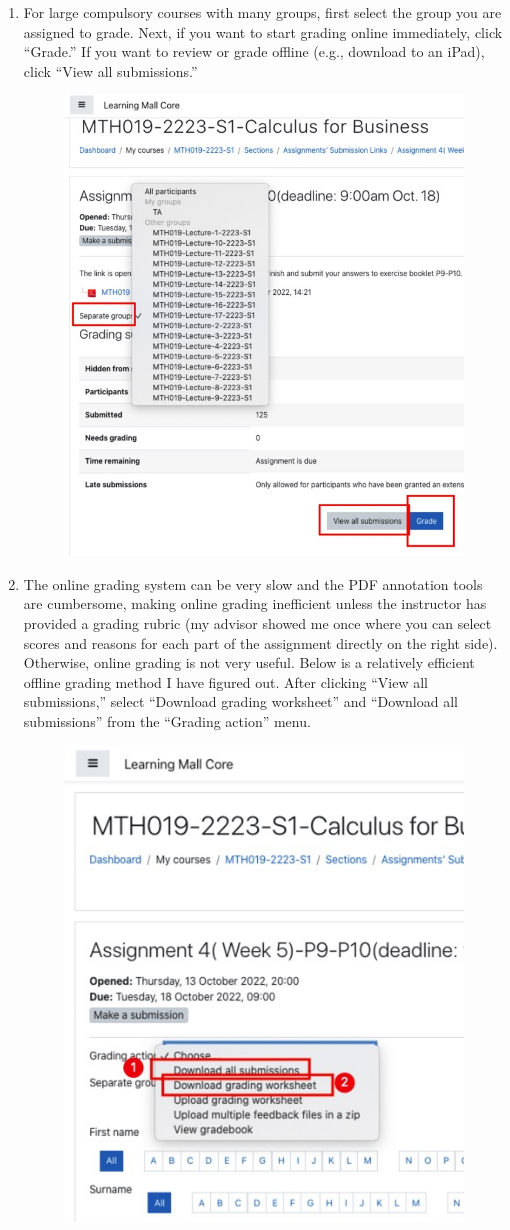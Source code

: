 \begin{enumerate}
    \item For large compulsory courses with many groups, first select the group you are assigned to grade. Next, if you want to start grading online immediately, click “Grade.” If you want to review or grade offline (e.g., download to an iPad), click “View all submissions.”
        \begin{figure}[H]
            \centering
            \includegraphics[width=0.5\columnwidth]{author-folder/Kai.Wu/LMO_inside_submission.jpg}
        \end{figure}
    \item The online grading system can be very slow and the PDF annotation tools are cumbersome, making online grading inefficient unless the instructor has provided a grading rubric (my advisor showed me once where you can select scores and reasons for each part of the assignment directly on the right side). Otherwise, online grading is not very useful. Below is a relatively efficient offline grading method I have figured out. After clicking “View all submissions,” select “Download grading worksheet” and “Download all submissions” from the “Grading action” menu.
        \begin{figure}[H]
            \centering
            \includegraphics[width=0.5\columnwidth]{author-folder/Kai.Wu/LMO_download.jpg}

\end{figure}
\end{enumerate}
